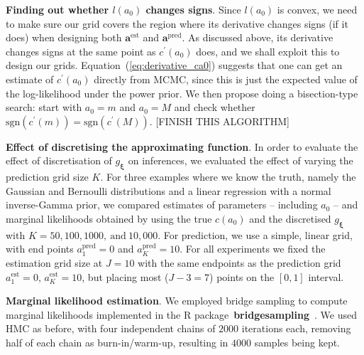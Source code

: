 \documentclass[a4paper, notitlepage, 11pt]{article}
\begin{document}
\textbf{Finding out whether $l(a_0)$ changes signs}.
Since $l(a_0)$ is convex, we need to make sure our grid covers the region where its derivative changes signs (if it does) when designing both $\boldsymbol a^{\text{est}}$ and $\boldsymbol a^{\text{pred}}$.
As discussed above, its derivative changes signs at the same point as $c^\prime(a_0)$ does, and we shall exploit this to design our grids.
Equation~(\ref{eq:derivative_ca0}) suggests that one can get an estimate of $c^\prime(a_0)$ directly from MCMC, since this is just the expected value of the log-likelihood under the power prior.
We then propose doing a bisection-type search: start with $a_0 = m$ and $a_0 = M$ and check whether $\text{sgn}(c^\prime(m)) = \text{sgn}(c^\prime(M))$.
[FINISH THIS ALGORITHM]

\textbf{Effect of discretising the approximating function}.
In order to evaluate the effect of discretisation of $g_{\boldsymbol\xi}$ on inferences, we evaluated the effect of varying the prediction grid size $K$.
For three examples where we know the truth, namely the Gaussian and Bernoulli distributions and a linear regression with a normal inverse-Gamma prior, we compared estimates of parameters -- including $a_0$ -- and marginal likelihoods obtained by using the true $c(a_0)$ and the discretised $g_{\boldsymbol\xi}$ with $K =  50, 100, 1000,~\text{and}\: 10, 000$.
For prediction, we use a simple, linear grid, with end points $a^{\text{pred}}_1 = 0$ and $a^{\text{pred}}_K = 10$.
For all experiments we fixed the estimation grid size at $J = 10$ with the same endpoints as the prediction grid $a^{\text{est}}_1 = 0$, $a^{\text{est}}_K = 10$, but placing most ($J-3 = 7$) points on the $[0, 1]$ interval.

\textbf{Marginal likelihood estimation}.
We employed  bridge sampling to compute marginal likelihoods implemented in the R package~\textbf{bridgesampling}~\citep{Gronau2017}.
We used HMC as before, with four independent chains of $2000$ iterations each, removing half of each chain as burn-in/warm-up, resulting in $4000$ samples being kept.


%  
\end{document}
